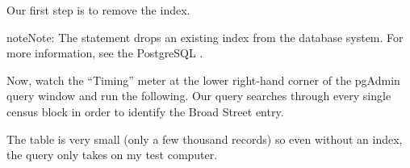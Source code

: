 \documentclass[a4paper,11pt,english]{sphinxmanual}
\begin{document}
Our first step is to remove the index.

\begin{sphinxVerbatim}[commandchars=\\\{\}]
  
\end{sphinxVerbatim}

\begin{sphinxadmonition}{note}{Note:}
The  statement drops an existing index from the database system. For more information, see the PostgreSQL .
\end{sphinxadmonition}

Now, watch the “Timing” meter at the lower right-hand corner of the pgAdmin query window and run the following. Our query searches through every single census block in order to identify the Broad Street entry.

\begin{sphinxVerbatim}[commandchars=\\\{\}]
 
   
   
   
    
\end{sphinxVerbatim}

\begin{sphinxVerbatim}[commandchars=\\\{\}]
\end{sphinxVerbatim}

The  table is very small (only a few thousand records) so even without an index, the query only takes  on my test computer.
\end{document}
